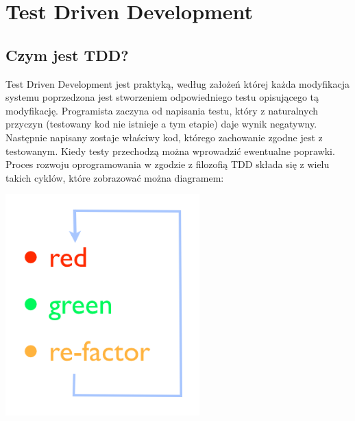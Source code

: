\chapter[Test Driven Development]{Test Driven Development}
  \section{Czym jest TDD?}
    Test Driven Development jest praktyką, według założeń której każda modyfikacja systemu poprzedzona jest stworzeniem odpowiedniego testu opisującego tą modyfikację. Programista zaczyna od napisania testu, który z naturalnych przyczyn (testowany kod nie istnieje a tym etapie) daje wynik negatywny. Następnie napisany zostaje właściwy kod, którego zachowanie zgodne jest z testowanym. Kiedy testy przechodzą można wprowadzić ewentualne poprawki.
    Proces rozwoju oprogramowania w zgodzie z filozofią TDD składa się z wielu takich cyklów, które zobrazować można diagramem:
    
    \includegraphics[width=75mm]{images/tdd_red_green_refactor.png}
    
